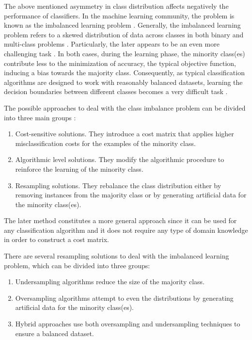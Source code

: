 \documentclass[remotesensing,article,submit,moreauthors,pdftex]{Definitions/mdpi}
\begin{document}
The above mentioned asymmetry in class distribution affects negatively the
performance of classifiers. In the machine learning community, the problem is
known as the imbalanced learning problem \cite{Chawla2004}. Generally, the
imbalanced learning problem refers to a skewed distribution of data across
classes in both binary and multi-class problems \cite{Abdi2016}. Particularly,
the later appears to be an even more challenging task \cite{Garcia2018}. In both
cases, during the learning phase, the minority class(es) contribute less to the
minimization of accuracy, the typical objective function, inducing a bias
towards the majority class. Consequently, as typical classification algorithms
are designed to work with reasonably balanced datasets, learning the decision
boundaries between different classes becomes a very difficult task
\cite{Saez2016}.

The possible approaches to deal with the class imbalance problem can be divided
into three main groups \cite{Fernandez2013}:

\begin{enumerate}

	\item Cost-sensitive solutions. They introduce a cost matrix that applies
	      higher misclassification costs for the examples of the minority class.
	      
	\item Algorithmic level solutions. They modify the algorithmic procedure to
	      reinforce the learning of the minority class.
	      
	\item Resampling solutions. They rebalance the class distribution either by
	      removing instances from the majority class or by generating artificial data
	      for the minority class(es).
	      
\end{enumerate}

The later method constitutes a more general approach since it can be used for
any classification algorithm and it does not require any type of domain
knowledge in order to construct a cost matrix.

There are several resampling solutions to deal with the imbalanced learning
problem, which can be divided into three groups:

\begin{enumerate}

	\item Undersampling algorithms reduce the size of the majority class.
	      
	\item Oversampling algorithms attempt to even the distributions by
	      generating artificial data for the minority class(es).
	      
	\item Hybrid approaches use both oversampling and undersampling techniques
	      to ensure a balanced dataset.
	      
\end{enumerate}
\end{document}
